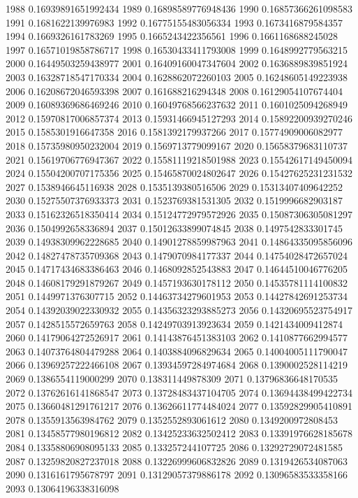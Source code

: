 1988 0.16939891651992434
1989 0.16898589776948436
1990 0.16857366261098583
1991 0.1681622139976983
1992 0.16775155483056334
1993 0.1673416879584357
1994 0.1669326161783269
1995 0.1665243422356561
1996 0.1661168688245028
1997 0.16571019858786717
1998 0.16530433411793008
1999 0.1648992779563215
2000 0.16449503259438977
2001 0.16409160047347604
2002 0.1636889839851924
2003 0.16328718547170334
2004 0.1628862072260103
2005 0.16248605149223938
2006 0.16208672046593398
2007 0.161688216294348
2008 0.16129054107674404
2009 0.16089369686469246
2010 0.16049768566237632
2011 0.1601025094268949
2012 0.15970817006857374
2013 0.15931466945127293
2014 0.15892200939270246
2015 0.1585301916647358
2016 0.1581392179937266
2017 0.15774909006082977
2018 0.15735980950232004
2019 0.1569713779099167
2020 0.15658379683110737
2021 0.15619706776947367
2022 0.15581119218501988
2023 0.15542617149450094
2024 0.15504200707175356
2025 0.15465870024802647
2026 0.15427625231231532
2027 0.1538946645116938
2028 0.1535139380516506
2029 0.15313407409642252
2030 0.15275507376933373
2031 0.1523769381531305
2032 0.1519996682903187
2033 0.15162326518350414
2034 0.15124772979572926
2035 0.15087306305081297
2036 0.1504992658336894
2037 0.15012633899074845
2038 0.1497542833301745
2039 0.14938309962228685
2040 0.14901278859987963
2041 0.14864335095856096
2042 0.14827478735709368
2043 0.1479070984177337
2044 0.14754028472657024
2045 0.14717434683386463
2046 0.1468092852543883
2047 0.14644510046776205
2048 0.14608179291879267
2049 0.1457193630178112
2050 0.14535781114100832
2051 0.1449971376307715
2052 0.14463734279601953
2053 0.14427842691253734
2054 0.14392039022330932
2055 0.14356323293885273
2056 0.14320695523754917
2057 0.1428515572659763
2058 0.14249703913923634
2059 0.1421434009412874
2060 0.14179064272526917
2061 0.14143876451383103
2062 0.1410877662994577
2063 0.14073764804479288
2064 0.1403884096829634
2065 0.14004005111790047
2066 0.13969257222466108
2067 0.13934597284974684
2068 0.1390002528114219
2069 0.1386554119000299
2070 0.138311449878309
2071 0.13796836648170535
2072 0.13762616141868547
2073 0.13728483437104705
2074 0.13694438499422734
2075 0.13660481291761217
2076 0.13626611774484024
2077 0.13592829905410891
2078 0.1355913563984762
2079 0.1352552893061612
2080 0.1349200972808453
2081 0.13458577980196812
2082 0.13425233632502412
2083 0.13391976628185678
2084 0.13358806908095133
2085 0.133257244107725
2086 0.13292729072481585
2087 0.13259820827237018
2088 0.13226999606832826
2089 0.1319426534087063
2090 0.1316161795678797
2091 0.13129057379886178
2092 0.13096583533358166
2093 0.13064196338316098
